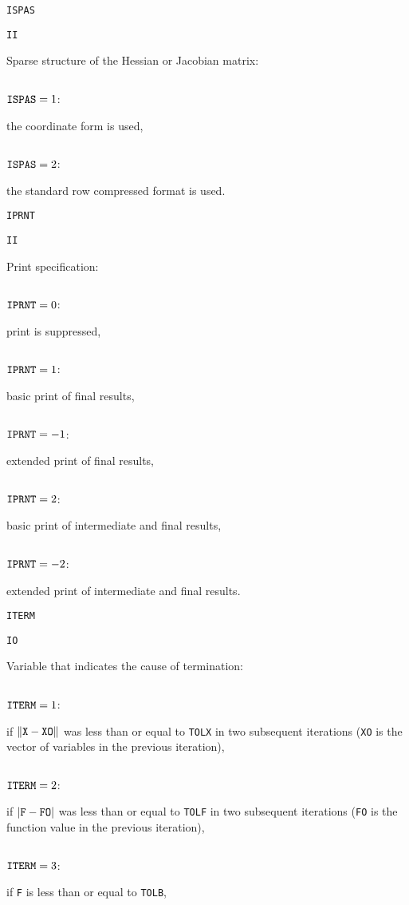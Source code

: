 \documentclass{esub2acm}
\begin{document}
\noindent\parbox{20mm}{\tt ISPAS}\parbox{10mm}{\tt II}\parbox[t]{125mm}{
  Sparse structure of the Hessian or Jacobian matrix:}
  \par\vspace{1mm}
\noindent\parbox{30mm}{$\;$}\parbox{24mm}{${\tt ISPAS}=1$:}\parbox[t]{101mm}{
  the coordinate form is used,}
  \par
\noindent\parbox{30mm}{$\;$}\parbox{24mm}{${\tt ISPAS}=2$:}\parbox[t]{101mm}{
  the standard row compressed format is used.}
  \par\vspace{2mm}
\noindent\parbox{20mm}{\tt IPRNT}\parbox{10mm}{\tt II}\parbox[t]{125mm}{
  Print specification:}
  \par\vspace{1mm}
\noindent\parbox{30mm}{$\;$}\parbox{24mm}{${\tt IPRNT}=0$:}\parbox[t]{101mm}{
  print is suppressed,}
  \par
\noindent\parbox{30mm}{$\;$}\parbox{24mm}{${\tt IPRNT}=1$:}\parbox[t]{101mm}{
  basic print of final results,}
  \par
\noindent\parbox{30mm}{$\;$}\parbox{24mm}{${\tt IPRNT}=-1$:}\parbox[t]{101mm}{
  extended print of final results,}
  \par
\noindent\parbox{30mm}{$\;$}\parbox{24mm}{${\tt IPRNT}=2$:}\parbox[t]{101mm}{
  basic print of intermediate and final results,}
  \par
\noindent\parbox{30mm}{$\;$}\parbox{24mm}{${\tt IPRNT}=-2$:}\parbox[t]{101mm}{
  extended print of intermediate and final results.}
  \par\vspace{2mm}
\noindent\parbox{20mm}{\tt ITERM}\parbox{10mm}{\tt IO}\parbox[t]{125mm}{
  Variable that indicates the cause of termination:}
  \par\vspace{1mm}
\noindent\parbox{30mm}{$\;$}\parbox{24mm}{${\tt ITERM}=1$:}\parbox[t]{101mm}{
  if $\|{\tt X} - {\tt XO}\|$ was less than or equal to {\tt TOLX} in two
  subsequent iterations ({\tt XO} is the vector of variables in the previous
  iteration),}
  \par
\noindent\parbox{30mm}{$\;$}\parbox{24mm}{${\tt ITERM}=2$:}\parbox[t]{101mm}{
  if $|{\tt F} - {\tt FO}|$ was less than or equal to {\tt TOLF} in two
  subsequent iterations ({\tt FO} is the function value in the previous
  iteration),}
  \par
\noindent\parbox{30mm}{$\;$}\parbox{24mm}{${\tt ITERM}=3$:}\parbox[t]{101mm}{
  if {\tt F} is less than or equal to {\tt TOLB},}
\end{document}

